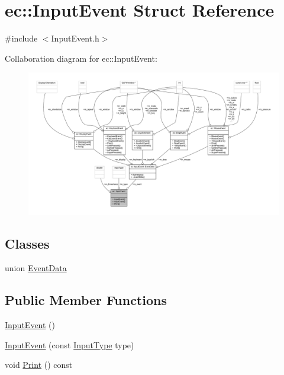 \hypertarget{structec_1_1_input_event}{}\section{ec\+:\+:Input\+Event Struct Reference}
\label{structec_1_1_input_event}


{\ttfamily \#include $<$Input\+Event.\+h$>$}



Collaboration diagram for ec\+:\+:Input\+Event\+:
\nopagebreak
\begin{figure}[H]
\begin{center}
\leavevmode
\includegraphics[width=350pt]{structec_1_1_input_event__coll__graph}
\end{center}
\end{figure}
\subsection*{Classes}
\begin{DoxyCompactItemize}
\item 
union \mbox{\hyperlink{unionec_1_1_input_event_1_1_event_data}{Event\+Data}}
\end{DoxyCompactItemize}
\subsection*{Public Member Functions}
\begin{DoxyCompactItemize}
\item 
\mbox{\hyperlink{structec_1_1_input_event_a0e1dd98eb4e1161bdb573afe429d07c8}{Input\+Event}} ()
\item 
\mbox{\hyperlink{structec_1_1_input_event_ae7dd00fad1ba770de42ba5b7e977bc79}{Input\+Event}} (const \mbox{\hyperlink{namespaceec_a5de6bdb8c4b2ed6e590e721ec998f964}{Input\+Type}} type)
\item 
void \mbox{\hyperlink{structec_1_1_input_event_a1ecc94cf2e36938b8bfc1c413de6ba04}{Print}} () const
\end{DoxyCompactItemize}
